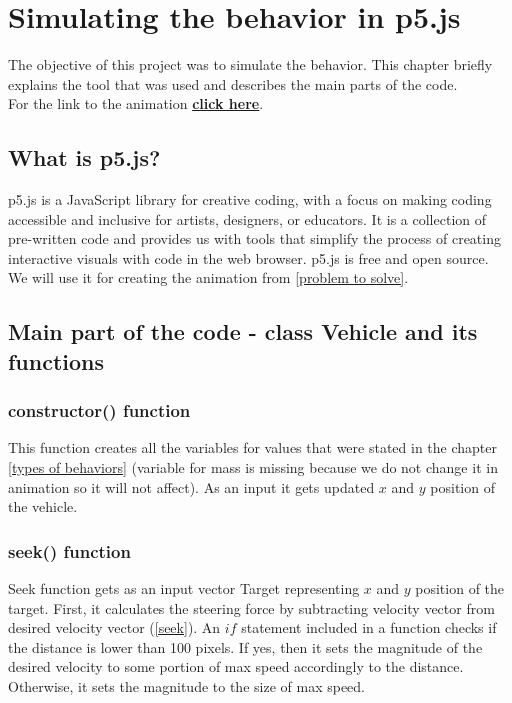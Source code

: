 \documentclass[10pt,twoside,english,a4paper]{article}
\begin{document}
\section{Simulating the behavior in p5.js} \label{simulation} 

The objective of this project was to simulate the behavior. This chapter briefly
explains the tool that was used and describes the main parts of the code.\\
For the link to the animation \textbf{\underline{\href{https://editor.p5js.org/RichardCernansky/sketches/E0zAXshWw}{click here}}}.

\subsection{What is p5.js?} \label{p5 char} 

p5.js is a JavaScript library for creative coding, with a focus on 
making coding accessible and inclusive for artists, designers, or 
educators. It is a collection of pre-written code and provides us 
with tools that simplify the process of creating interactive visuals 
with code in the web browser. p5.js is free and open source. We 
will use it for creating the animation from \ref{problem to solve}. 

\subsection{Main part of the code - class Vehicle and its functions} \label{class Vehicle} 

\subsubsection{constructor() function} \label{constructorf} 

This function creates all the variables for values that were stated in the 
chapter \ref{types of behaviors} (variable for mass is missing because we do not change it in animation
so it will not affect). As an input it gets updated $x$ and $y$ position
of the vehicle. 

\subsubsection{seek() function} \label{seekf} 

Seek function gets as an input vector Target representing $x$ and $y$ position
of the target. First, it calculates the steering force by subtracting velocity vector
from desired velocity vector (\ref{seek}). An $if$ statement included in a function checks if 
the distance is lower than 100 pixels. If yes, then it sets the magnitude of the 
desired velocity to some portion of max speed accordingly to the distance. 
Otherwise, it sets the magnitude to the size of max speed.
\end{document}
